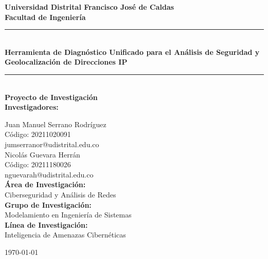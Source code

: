\begin{titlepage}
\centering
\vspace*{1cm}

\textbf{\Large Universidad Distrital Francisco José de Caldas}\\
\textbf{\large Facultad de Ingeniería}\\
\vspace{1cm}

\rule{\linewidth}{0.2mm} \\[0.4cm]
{\huge \bfseries Herramienta de Diagnóstico Unificado para el Análisis de Seguridad y Geolocalización de Direcciones IP}\\
\rule{\linewidth}{0.2mm} \\[0.4cm]

{\large \textbf{Proyecto de Investigación}}\\[1cm]

{\large \textbf{Investigadores:}}\\
\vspace{0.5cm}

Juan Manuel Serrano Rodríguez\\
Código: 20211020091\\
jumserranor@udistrital.edu.co\\[1cm]
Nicolás Guevara Herrán\\
Código: 20211180026\\
nguevarah@udistrital.edu.co\\[0.5cm]

{\large \textbf{Área de Investigación:}}\\
Ciberseguridad y Análisis de Redes\\[0.5cm]

{\large \textbf{Grupo de Investigación:}}\\
Modelamiento en Ingeniería de Sistemas\\[0.5cm]

{\large \textbf{Línea de Investigación:}}\\
Inteligencia de Amenazas Cibernéticas\\[0.5cm]

\vfill

{\large \today}

\end{titlepage}
